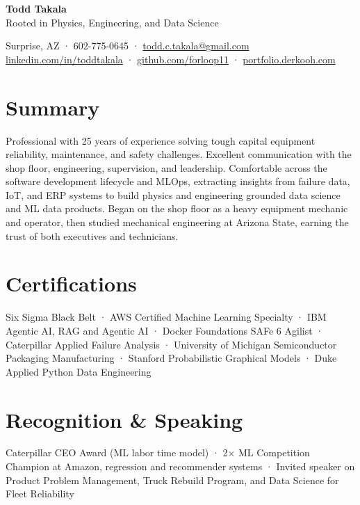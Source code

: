\documentclass[10pt]{article}
\begin{document}
\begin{center}
  {\color{navy}\Huge\bfseries Todd Takala}\\[3pt]
  {\color{slate} Rooted in Physics, Engineering, and Data Science\\[4pt]}
  
  {\small Surprise, AZ · 602-775-0645 · \href{mailto:todd.c.takala@gmail.com}{todd.c.takala@gmail.com}}\\[2pt]
  {\small \href{https://www.linkedin.com/in/toddtakala}{linkedin.com/in/toddtakala} ·
          \href{https://www.github.com/forloop11}{github.com/forloop11} ·
          \href{https://portfolio.derkooh.com/}{portfolio.derkooh.com}}
\end{center}

\section{Summary}
Professional with 25 years of experience solving tough capital equipment reliability, maintenance, and safety challenges. Excellent communication with the shop floor, engineering, supervision, and leadership. Comfortable across the software development lifecycle and MLOps, extracting insights from failure data, IoT, and ERP systems to build physics and engineering grounded data science and ML data products. Began on the shop floor as a heavy equipment mechanic and operator, then studied mechanical engineering at Arizona State, earning the trust of both executives and technicians.

\section{Certifications}
Six Sigma Black Belt · AWS Certified Machine Learning Specialty · IBM Agentic AI, RAG and Agentic AI · Docker Foundations 
SAFe 6 Agilist · Caterpillar Applied Failure Analysis · University of Michigan Semiconductor Packaging Manufacturing · Stanford Probabilistic Graphical Models · Duke Applied Python Data Engineering


\section{Recognition \& Speaking}
Caterpillar CEO Award (ML labor time model) · 2× ML Competition Champion at Amazon, regression and recommender systems · Invited speaker on Product Problem Management, Truck Rebuild Program, and Data Science for Fleet Reliability
\end{document}

